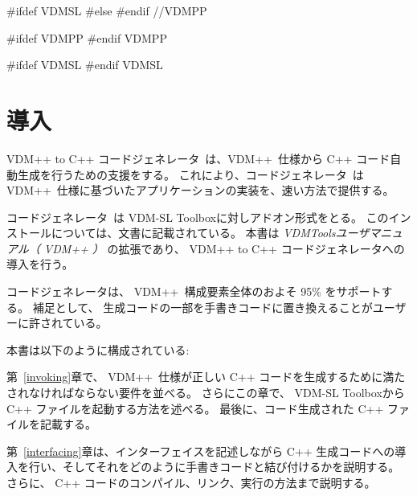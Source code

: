 \documentclass[\pformat,12pt]{jarticle}
\newcommand{\ToolboxName}{VDM-SL Toolbox}
\newcommand{\toolbox}{Toolbox}
\newcommand{\ToolboxName}{VDM++ Toolbox}
\newcommand{\toolbox}{toolbox}
\begin{document}
#ifdef VDMSL
#else
#endif //VDMPP


\newcommand{\tcg}{コードジェネレータ}
\newcommand{\Tcg}{コードジェネレータ}

#ifdef VDMPP
\newcommand{\libmancite}{\cite{LibMan-SCSK}}
\newcommand{\langmancite}{\cite{LangManPP-SCSK}}
\newcommand{\VDM}{VDM++}
\newcommand{\cg}{VDM++ to C++ コードジェネレータ}
\newcommand{\MCL}{VDM C++ ライブラリ}
\newcommand{\CGBase}{\texttt{CGBase}}
#endif VDMPP

#ifdef VDMSL
\newcommand{\libmancite}{\cite{LibMan-SCSK}}
\newcommand{\langmancite}{\cite{LangMan-SCSK}}
\newcommand{\cg}{VDM-SL to C++ Code Generator}
\newcommand{\MCL}{VDM C++ Library}
\newcommand{\VDM}{VDM-SL}
#endif VDMSL


\section{導入}


\cg\ は、\VDM\ 仕様から C++ コード自動生成を行うための支援をする。
これにより、\tcg\ は \VDM\ 仕様に基づいたアプリケーションの実装を、速い方法で提供する。

 \Tcg\ は \ToolboxName{}に対しアドオン形式をとる。
このインストールについては、文書に記載されている。
本書は {\em VDMToolsユーザマニュアル（ \VDM{} ）} の拡張であり、 \cg{}への導入を行う。

コードジェネレータは、 \VDM\ 構成要素全体のおよそ 95\% をサポートする。
補足として、 生成コードの一部を手書きコードに置き換えることがユーザーに許されている。

本書は以下のように構成されている:

第~\ref{invoking}章で、 \VDM\ 仕様が正しい C++ コードを生成するために満たされなければならない要件を並べる。
さらにこの章で、 \ToolboxName{}からC++ ファイルを起動する方法を述べる。
最後に、コード生成された C++ ファイルを記載する。

第~\ref{interfacing}章は、インターフェイスを記述しながら C++ 生成コードへの導入を行い、そしてそれをどのように手書きコードと結び付けるかを説明する。
さらに、 C++ コードのコンパイル、リンク、実行の方法まで説明する。
\end{document}
